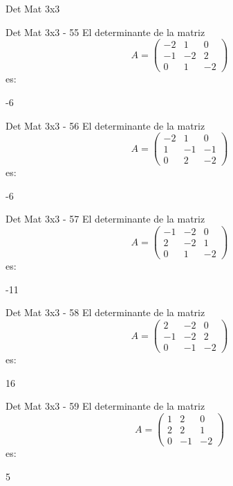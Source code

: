 \documentclass[a4,11pt]{aleph-notas}
\begin{document}
\begin{quiz}{Det Mat 3x3}
\begin{numerical}[tolerance=0]%
    {Det Mat 3x3 - 55}
    El determinante de la matriz
    \[
        A = \begin{pmatrix} -2 & 1 & 0 \\ -1 & -2 & 2 \\ 0 & 1 & -2 \end{pmatrix}
    \]
    es:
    \item[] -6
\end{numerical}

\begin{numerical}[tolerance=0]%
    {Det Mat 3x3 - 56}
    El determinante de la matriz
    \[
        A = \begin{pmatrix} -2 & 1 & 0 \\ 1 & -1 & -1 \\ 0 & 2 & -2 \end{pmatrix}
    \]
    es:
    \item[] -6
\end{numerical}

\begin{numerical}[tolerance=0]%
    {Det Mat 3x3 - 57}
    El determinante de la matriz
    \[
        A = \begin{pmatrix} -1 & -2 & 0 \\ 2 & -2 & 1 \\ 0 & 1 & -2 \end{pmatrix}
    \]
    es:
    \item[] -11
\end{numerical}

\begin{numerical}[tolerance=0]%
    {Det Mat 3x3 - 58}
    El determinante de la matriz
    \[
        A = \begin{pmatrix} 2 & -2 & 0 \\ -1 & -2 & 2 \\ 0 & -1 & -2 \end{pmatrix}
    \]
    es:
    \item[] 16
\end{numerical}

\begin{numerical}[tolerance=0]%
    {Det Mat 3x3 - 59}
    El determinante de la matriz
    \[
        A = \begin{pmatrix} 1 & 2 & 0 \\ 2 & 2 & 1 \\ 0 & -1 & -2 \end{pmatrix}
    \]
    es:
    \item[] 5
\end{numerical}


\end{quiz}
\end{document}
